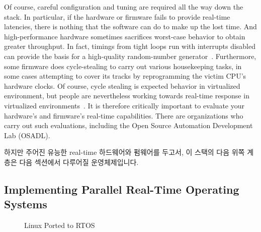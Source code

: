 Of course, careful configuration and tuning are required all the way down
the stack.
In particular, if the hardware or firmware fails to provide real-time
latencies, there is nothing that the software can do to make up the
lost time.
And high-performance hardware sometimes sacrifices worst-case behavior
to obtain greater throughput.
In fact, timings from tight loops run with interrupts disabled can
provide the basis for a high-quality random-number
generator~\cite{PeterOkech2009InherentRandomness}.
Furthermore, some firmware does cycle-stealing to carry out various
housekeeping tasks, in some cases attempting to cover its tracks by
reprogramming the victim CPU's hardware clocks.
Of course, cycle stealing is expected behavior in virtualized
environment, but people are nevertheless working towards real-time
response in virtualized
environments~\cite{ThomasGleixner2012KVMrealtime,JanKiszka2014virtRT}.
It is therefore critically important to evaluate your hardware's and
firmware's real-time capabilities.
There are organizations who carry out such evaluations, including
the Open Source Automation Development Lab (OSADL).
\fi

하지만 주어진 유능한 real-time 하드웨어와 펌웨어를 두고서, 이 스택의 다음 위쪽
계층은 다음 섹션에서 다루어질 운영체제입니다.

\subsection{Implementing Parallel Real-Time Operating Systems}
\label{sec:advsync:Implementing Parallel Real-Time Operating Systems}

\begin{figure}[tb]
\centering
{}
\caption{Linux Ported to RTOS}
\label{fig:advsync:Linux Ported to RTOS}
\end{figure}

